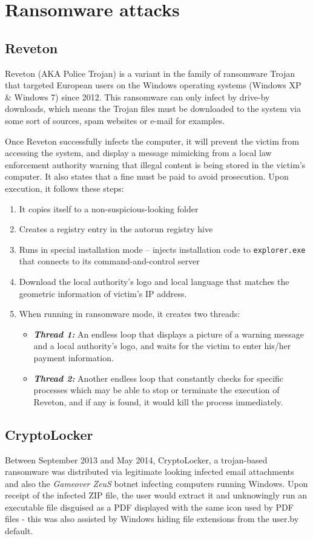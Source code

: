 \documentclass[10pt,a4paper]{article}
\begin{document}
\section{Ransomware attacks}
\subsection{Reveton}
Reveton (AKA Police Trojan) is a variant in the family of ransomware Trojan that targeted European users on the Windows operating systems (Windows XP \& Windows 7) since 2012. This ransomware can only infect by drive-by downloads, which means the Trojan files must be downloaded to the system via some sort of sources, spam websites or e-mail for examples.

Once Reveton successfully infects the computer, it will prevent the victim from accessing the system, and display a message mimicking from a local law enforcement authority warning that illegal content is being stored in the victim’s computer. It also states that a fine must be paid to avoid prosecution.
Upon execution, it follows these steps:
\begin{enumerate}
\item It copies itself to a non-suspicious-looking folder
\item Creates a registry entry in the autorun registry hive
\item Runs in special installation mode – injects installation code to \texttt{explorer.exe} that connects to its command-and-control server
\item Download the local authority’s logo and local language that matches the geometric information of victim’s IP address.
\item When running in ransomware mode, it creates two threads:
\begin{itemize}
\item \textbf{\textit{Thread 1: }}An endless loop that displays a picture of a warning message and a local authority’s logo, and waits for the victim to enter his/her payment information.
\item \textbf{\textit{Thread 2: }}Another endless loop that constantly checks for specific processes which may be able to stop or terminate the execution of Reveton, and if any is found, it would kill the process immediately.
\end{itemize}
\end{enumerate}

\subsection{CryptoLocker}
Between September 2013 and May 2014, CryptoLocker, a trojan-based ransomware was distributed via legitimate looking infected email attachments and also the \textit{Gameover ZeuS} botnet infecting computers running Windows. Upon receipt of the infected ZIP file, the user would extract it and unknowingly run an executable file disguised as a PDF displayed with the same icon used by PDF files \-- this was also assisted by Windows hiding file extensions from the user.by default.
\end{document}
